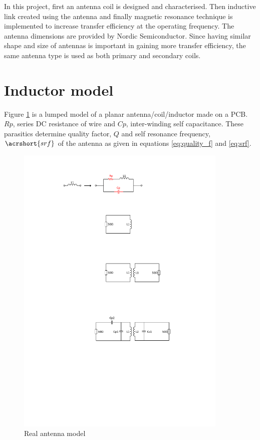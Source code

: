 \documentclass[UKenglish]{ifimaster}  %
\begin{document}
In this project, first an antenna coil is designed and characterised. Then inductive link created using the antenna
and finally magnetic resonance technique is implemented to increase transfer efficiency at the operating frequency. The antenna 
dimensions are provided by Nordic Semiconductor. Since having 
similar shape and size of antennas is important in gaining more transfer efficiency, the same antenna type is used as both 
primary and secondary coils. \\

\section{Inductor model}		%

Figure \ref{fig:ant_non_ideal} is a lumped model of a planar antenna/coil/inductor made on a PCB. $Rp$, series DC resistance of wire and $Cp$, 
inter-winding self capacitance. These parasitics determine quality factor, $Q$ and self resonance frequency, $\acrshort{srf}$ of 
the antenna as given in equations  \ref{eq:quality_f} and  \ref{eq:srf}.  \\

\begin{figure}[!htbp] %
   \centering
   \includegraphics[width=0.9\textwidth]{img/ant_non_ideal.pdf} 
   \caption{Real antenna model}
   \label{fig:ant_non_ideal}
\end{figure}
\end{document}
